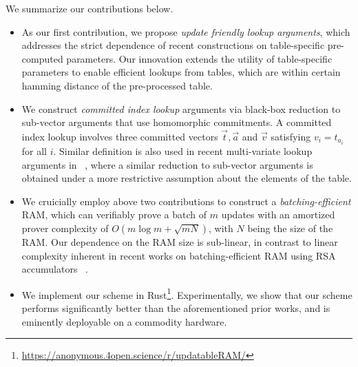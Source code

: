 \documentclass[sigconf]{acmart}
\begin{document}
We summarize our contributions below.
\begin{itemize}[leftmargin=2em]
\item As our first contribution, we propose {\em update friendly lookup arguments}, which addresses
the strict dependence of recent constructions on table-specific pre-computed parameters. Our
innovation extends the utility of table-specific parameters to enable efficient lookups from tables,
which are within certain hamming distance of the pre-processed table.
\item We construct {\em committed index lookup} arguments via black-box reduction to
sub-vector arguments that use homomorphic commitments. A committed index lookup involves
three committed vectors $\vec{t},\vec{a}$ and $\vec{v}$ satisfying $v_i=t_{a_i}$ for all $i$. Similar
definition is also used in recent multi-variate lookup arguments in ~\cite{lasso}, where a similar reduction
to sub-vector arguments is obtained under a more restrictive assumption about the elements of the table.
\item We cruicially employ above two contributions to construct a {\em batching-efficient} RAM, which
can verifiably prove a batch of $m$ updates with an amortized prover complexity of $O(m\log m + \sqrt{mN})$,
with $N$ being the size of the RAM. Our dependence on the RAM size is sub-linear, in contrast to linear complexity
inherent in recent works on batching-efficient RAM using RSA accumulators ~\cite{USENIX:OWWB20,CCS:CFHKKO22}.
\item We implement our scheme in Rust\footnote{\url{https://anonymous.4open.science/r/updatableRAM/}}.
Experimentally, we show that our scheme performs significantly better than the aforementioned prior works,
and is eminently deployable on a commodity hardware.
\end{itemize}
\end{document}
